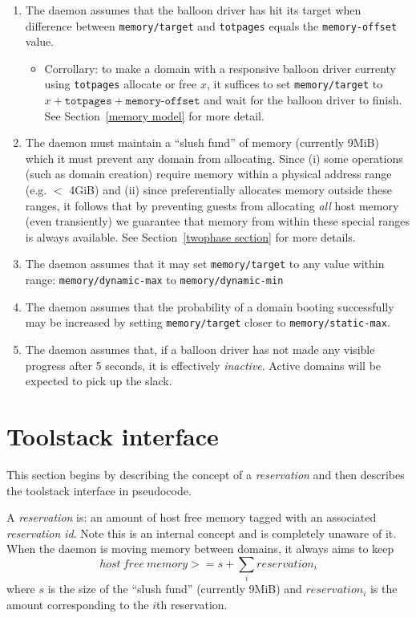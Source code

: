 \documentclass{article}
\begin{document}
\begin{enumerate}
\item The \squeezed{} daemon assumes that the balloon driver has hit its target when difference between \texttt{memory/target} and \texttt{totpages} equals the \texttt{memory-offset} value.
\begin{itemize}
\item Corrollary: to make a domain with a responsive balloon driver currenty using \texttt{totpages} allocate or free $x$, it suffices to set \texttt{memory/target} to $x+\texttt{totpages}+\texttt{memory-offset}$ and wait for the balloon driver to finish. See Section~\ref{memory model} for more detail.
\end{itemize}
\item The \squeezed{} daemon must maintain a ``slush fund'' of memory (currently 9MiB) which it must prevent any domain from allocating. Since (i) some \xen{} operations (such as domain creation) require memory within a physical address range (e.g. $<$ 4GiB) and (ii) since \xen{} preferentially allocates memory outside these ranges, it follows that by preventing guests from allocating {\em all} host memory (even transiently) we guarantee that memory from within these special ranges is always available. See Section~\ref{twophase section} for more details.

\item The \squeezed{} daemon assumes that it may set \texttt{memory/target} to any value within range: \texttt{memory/dynamic-max} to \texttt{memory/dynamic-min}

\item The \squeezed{} daemon assumes that the probability of a domain booting successfully may be increased by setting \texttt{memory/target} closer to \texttt{memory/static-max}.

\item The \squeezed{} daemon assumes that, if a balloon driver has not made any visible progress after 5 seconds, it is effectively {\em inactive}. Active domains will be expected to pick up the slack.
\end{enumerate}

\section{Toolstack interface}
\label{Toolstack interface}

This section begins by describing the concept of a {\em reservation} and then describes the toolstack interface in pseudocode.

A {\em reservation} is: an amount of host free memory tagged with an associated {\em reservation id}.
Note this is an internal \squeezed{} concept and \xen{} is completely unaware of it. When the daemon is moving memory between domains, it always aims to keep 
\[
\mathit{host\ free\ memory} >= s + \sum_i{\mathit{reservation}_i}
\]
where $s$ is the size of the ``slush fund'' (currently 9MiB) and $\mathit{reservation}_i$ is the amount corresponding to the $i$th reservation.
\end{document}
